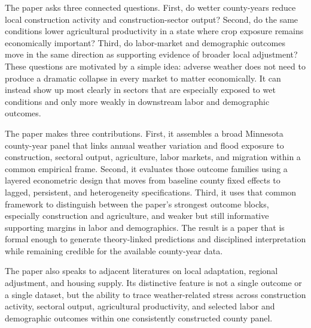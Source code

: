 \documentclass[12pt]{article}
\begin{document}
The paper asks three connected questions. First, do wetter county-years reduce local construction activity and construction-sector output? Second, do the same conditions lower agricultural productivity in a state where crop exposure remains economically important? Third, do labor-market and demographic outcomes move in the same direction as supporting evidence of broader local adjustment? These questions are motivated by a simple idea: adverse weather does not need to produce a dramatic collapse in every market to matter economically. It can instead show up most clearly in sectors that are especially exposed to wet conditions and only more weakly in downstream labor and demographic outcomes.

The paper makes three contributions. First, it assembles a broad Minnesota county-year panel that links annual weather variation and flood exposure to construction, sectoral output, agriculture, labor markets, and migration within a common empirical frame. Second, it evaluates those outcome families using a layered econometric design that moves from baseline county fixed effects to lagged, persistent, and heterogeneity specifications. Third, it uses that common framework to distinguish between the paper's strongest outcome blocks, especially construction and agriculture, and weaker but still informative supporting margins in labor and demographics. The result is a paper that is formal enough to generate theory-linked predictions and disciplined interpretation while remaining credible for the available county-year data.

The paper also speaks to adjacent literatures on local adaptation, regional adjustment, and housing supply. Its distinctive feature is not a single outcome or a single dataset, but the ability to trace weather-related stress across construction activity, sectoral output, agricultural productivity, and selected labor and demographic outcomes within one consistently constructed county panel.
\end{document}
